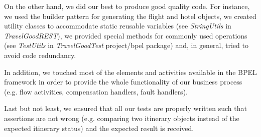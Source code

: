 On the other hand, we did our best to produce good quality code. For instance, we used the builder pattern for generating the flight and hotel objects, we created utility classes to accommodate static reusable variables (see \textit{StringUtils} in \textit{TravelGoodREST}), we provided special methods for commonly used operations (see \textit{TestUtils} in \textit{TravelGoodTest} project/bpel package) and, in general, tried to avoid code redundancy. 

In addition, we touched most of the elements and activities available in the BPEL framework in order to provide the whole functionality of our business process (e.g. flow activities, compensation handlers, fault handlers).

Last but not least, we ensured that all our tests are properly written such that assertions are not wrong (e.g. comparing two itinerary objects instead of the expected itinerary status) and the expected result is received. 
